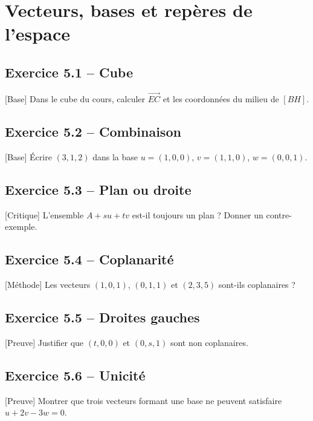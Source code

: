 \chapter{Vecteurs, bases et repères de l’espace}
\section*{Exercice 5.1 -- Cube}
[Base] Dans le cube du cours, calculer $\overrightarrow{EC}$ et les coordonnées du milieu de $[BH]$.

\section*{Exercice 5.2 -- Combinaison}
[Base] Écrire $(3,1,2)$ dans la base $u=(1,0,0)$, $v=(1,1,0)$, $w=(0,0,1)$.

\section*{Exercice 5.3 -- Plan ou droite}
[Critique] L'ensemble $A+su+tv$ est-il toujours un plan ? Donner un contre-exemple.

\section*{Exercice 5.4 -- Coplanarité}
[Méthode] Les vecteurs $(1,0,1)$, $(0,1,1)$ et $(2,3,5)$ sont-ils coplanaires ?

\section*{Exercice 5.5 -- Droites gauches}
[Preuve] Justifier que $(t,0,0)$ et $(0,s,1)$ sont non coplanaires.

\section*{Exercice 5.6 -- Unicité}
[Preuve] Montrer que trois vecteurs formant une base ne peuvent satisfaire $u+2v-3w=0$.
